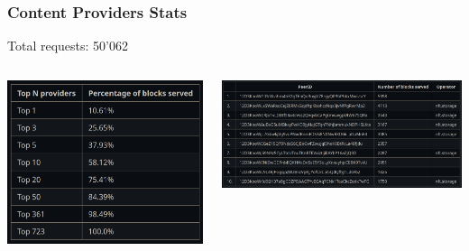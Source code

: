 \documentclass{../pl-slide}
\begin{document}
\begin{frame}
\frametitle{Content Providers Stats}
\greencube\hspace{0.4em} Total requests: 50'062
\begin{columns}[onlytextwidth]
\begin{column}{0.35\textwidth}
    \begin{center}
                \includegraphics[width=\textwidth]{plots/top_provs.png}
    \end{center}
\end{column}
\begin{column}{0.64\textwidth}
    \begin{center}
                \includegraphics[width=\textwidth]{plots/top10.png}
    \end{center}
\end{column}
\end{columns}
\end{frame}
\end{document}
